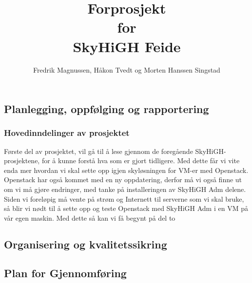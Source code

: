 \documentclass[12pt,a4paper]{article}
\begin{document}
\title{Forprosjekt \\ for \\ SkyHiGH Feide}
\author{Fredrik Magnussen, Håkon Tvedt og Morten Hanssen Singstad}
\maketitle

\newpage
\tableofcontents

\newpage
\subsection{Planlegging, oppfølging og rapportering}
\subsubsection{Hovedinndelinger av prosjektet}
Første del av prosjektet, vil gå til å lese gjennom de foregående SkyHiGH-prosjektene, for å kunne forstå hva som er 
gjort tidligere. Med dette får vi vite enda mer hvordan vi skal sette opp igjen skyløsningen for VM-er med Openstack.
Openstack har også kommet med en ny oppdatering, derfor må vi også finne ut om vi må gjøre endringer, med tanke på installeringen 
av SkyHiGH Adm delene. Siden vi foreløpig må vente på strøm og Internett til serverne som vi skal bruke, så blir vi nødt til å 
sette opp og teste Openstack med SkyHiGH Adm i en VM på vår egen maskin. \newline \newline
Med dette så kan vi få begynt på del to 

\subsection{Organisering og kvalitetssikring}

\subsection{Plan for Gjennomføring}
\end{document}
